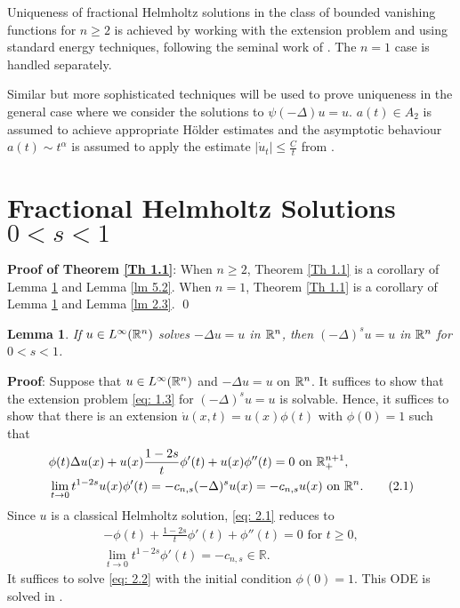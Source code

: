 \documentclass{article}
\newtheorem{theorem}{Theorem}[section]
\newtheorem{lemma}[theorem]{Lemma}
\begin{document}
Uniqueness of fractional Helmholtz solutions in the class of bounded vanishing functions for $n \ge 2$ is achieved by working with the extension problem and using standard energy techniques, following the seminal work of \cite{Frank}.  The $n=1$ case is handled separately.




Similar but more sophisticated techniques will be used to prove uniqueness in the general case where we consider the solutions to $\psi(-\Delta)u = u$. $a(t) \in A_2$ is assumed to achieve appropriate H\"{o}lder estimates and the asymptotic behaviour $a(t) \sim t^\alpha$ is assumed to apply the estimate $|\dot{u}_t| \le \frac{C}{t}$ from \cite[Prop 4.6]{cabre}.


\section{Fractional Helmholtz Solutions $0<s<1$}

\textbf{Proof of Theorem \ref{Th 1.1}}: When $n \ge 2$, Theorem \ref{Th 1.1} is a corollary of Lemma \ref{lm 2.1} and Lemma \ref{lm 5.2}. When $n=1$, Theorem \ref{Th 1.1} is a corollary of Lemma \ref{lm 2.1} and Lemma \ref{lm 2.3}. \qed

\begin{lemma}
\label{lm 2.1}
If $u\in L^\infty(\mathbb{R}^n)$ solves $-\Delta u = u $ in $\mathbb{R}^n$, then  $(-\Delta)^s u = u$ in $\mathbb{R}^n$ for $0<s<1$.
\end{lemma}

\noindent
\textbf{Proof}: Suppose that $u\in L^\infty(\mathbb{R}^n)$ and $-\Delta u = u$ on $\mathbb{R}^n$. It suffices to show that the extension problem \eqref{eq: 1.3} for $(-\Delta)^s u = u$ is solvable. Hence, it suffices to show that there is an extension  $\dot{u}(x,t)=u(x)\phi(t)$ with $\phi(0)=1$ such that
\begin{align*}
    & \phi(t)\Delta u(x)+ u(x)\frac{1-2s}{t}\phi'(t)+u(x)\phi''(t)=0 \textrm{ on } \mathbb{R}^{n+1}_+, \\
    & \lim\limits_{t \to 0} t^{1-2s}u(x)\phi'(t) = -c_{n,s}(-\Delta)^s u(x) = -c_{n,s}u(x) \textrm{ on } \mathbb{R}^n. 
    \tag{2.1} \label{eq: 2.1}
\end{align*}
Since $u$ is a classical Helmholtz solution, \eqref{eq: 2.1} reduces to
\begin{align*}
    -\phi(t) + \frac{1-2s}{t}\phi'(t)+\phi''(t)=0 \textrm{ for } t \ge 0, \\
    \lim\limits_{t \to 0} t^{1-2s}\phi'(t) = -c_{n,s} \in \mathbb{R}.
    \tag{2.2} \label{eq: 2.2}
\end{align*}
It suffices to solve \eqref{eq: 2.2} with the initial condition $\phi(0)=1$. This ODE is solved in  \cite[Section 3.2]{cs}. 
\qedsymbol \\
    
\end{document}
